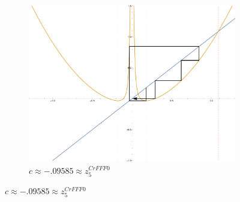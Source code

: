 \begin{figure}[ht]
\begin{subfigure}[b]{0.3\textwidth}
				\includegraphics[width=\textwidth]{./img/plot-009585}
				\caption{$c \approx -.09585 \approx z_5^{CrFFF0}$}
		\end{subfigure}


\end{figure}
